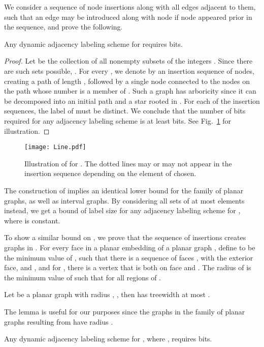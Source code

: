 \documentclass{llncs}
\begin{document}
We consider a sequence of node insertions along with all edges adjacent to them, such that an edge  may be introduced along with node  if  node  appeared prior in the sequence, and prove the following.
\begin{theorem}\label{theorem:lower-arboricity}
 Any dynamic adjacency labeling scheme for   requires  bits.
\end{theorem}
\begin{proof}
Let  be the collection of all  nonempty  subsets  of  the integers .
Since there are  such sets possible, .
For every , we denote  by  an  insertion sequence   of   nodes, creating  a path of length , followed by  a single node  connected to the nodes on the path whose number is a member of .
Such a graph has  arboricity  since it can be decomposed into an initial path and a star rooted in .
For each of the   insertion sequences, the label of  must be distinct.
We  conclude that the number of bits required for any adjacency labeling scheme
is at least  bits.
See Fig.~\ref{fig:AdjLowerBoundGraphs} for illustration. 
\end{proof}
\vspace*{-5ex}
			\begin{figure}
				\centering
				\texttt{[image: Line.pdf]}
				\caption{Illustration of  for . The dotted lines may or may not appear in the insertion sequence depending on the element of  chosen. }
				\label{fig:AdjLowerBoundGraphs}
			\end{figure}
\vspace*{-2ex}
The construction of   implies an identical lower
bound for the family of planar graphs, as well as interval graphs. By
 considering all sets  of at most  elements instead, we get
a bound of  label size for any adjacency labeling scheme for , where  is constant.

To show a similar bound on , we prove  that the sequence of insertions creates graphs in .
For every face  in  a planar embedding  of a  planar graph , define
 to be the minimum value of , such that there is a sequence of faces
, with  the exterior face, and , and for , there is a vertex  that is both on face  and . The
radius of  is the minimum value of  such that  for all
regions  of .
\begin{lemma}\cite{bodlaender1988dynamic}\label{lemma:bodlander}
Let  be a planar graph with radius , , then  has treewidth at most .
\end{lemma}
The lemma is useful for our purposes since  the graphs in the  family of  planar graphs resulting from   have radius .
\begin{corollary}
 Any dynamic adjacency labeling scheme for , where  , requires  bits.
\end{corollary}
\end{document}
